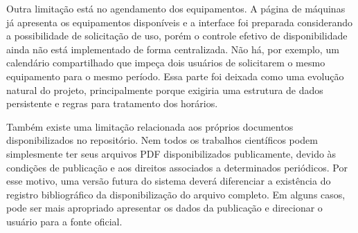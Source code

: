 Outra limitação está no agendamento dos equipamentos. A página de máquinas já apresenta os equipamentos disponíveis e a interface foi preparada considerando a possibilidade de solicitação de uso, porém o controle efetivo de disponibilidade ainda não está implementado de forma centralizada. Não há, por exemplo, um calendário compartilhado que impeça dois usuários de solicitarem o mesmo equipamento para o mesmo período. Essa parte foi deixada como uma evolução natural do projeto, principalmente porque exigiria uma estrutura de dados persistente e regras para tratamento dos horários.

Também existe uma limitação relacionada aos próprios documentos disponibilizados no repositório. Nem todos os trabalhos científicos podem simplesmente ter seus arquivos PDF disponibilizados publicamente, devido às condições de publicação e aos direitos associados a determinados periódicos. Por esse motivo, uma versão futura do sistema deverá diferenciar a existência do registro bibliográfico da disponibilização do arquivo completo. Em alguns casos, pode ser mais apropriado apresentar os dados da publicação e direcionar o usuário para a fonte oficial.
